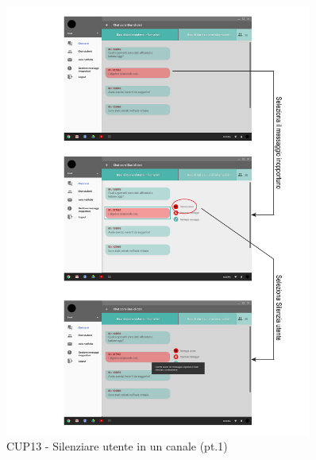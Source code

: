 \begin{figure}
	\centering
	\includegraphics[width=0.9\textwidth]{imgs/gruppo6/activities/act_cup13_silenziare_utente1.pdf}
	\caption{CUP13 - Silenziare utente in un canale (pt.1)}
	\label{fig:cup13}
\end{figure}

